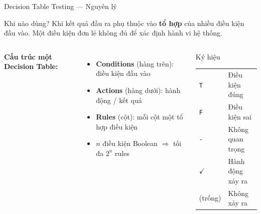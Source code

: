 \documentclass[aspectratio=169,12pt]{beamer}
\begin{document}
\begin{frame}{Decision Table Testing --- Nguyên lý}
  \begin{block}{Khi nào dùng?}
    Khi kết quả đầu ra phụ thuộc vào \textbf{tổ hợp} của nhiều điều kiện
    đầu vào. Một điều kiện đơn lẻ không đủ để xác định hành vi hệ thống.
  \end{block}

  \vspace{0.4em}
  \begin{columns}[T,onlytextwidth]
    \textbf{Cấu trúc một Decision Table:}
    \begin{itemize}
      \item \textbf{Conditions} (hàng trên): điều kiện đầu vào
      \item \textbf{Actions} (hàng dưới): hành động / kết quả
      \item \textbf{Rules} (cột): mỗi cột một tổ hợp điều kiện
      \item $n$ điều kiện Boolean $\Rightarrow$ tối đa $2^n$ rules
    \end{itemize}

    \begin{block}{Ký hiệu}
      {\small
      \begin{tabular}{ll}
        \texttt{T} & Điều kiện đúng \\
        \texttt{F} & Điều kiện sai \\
        \texttt{-} & Không quan trọng \\
        $\checkmark$ & Hành động xảy ra \\
        (trống) & Không xảy ra \\
      \end{tabular}
      }
    \end{block}
  \end{columns}
\end{frame}
\end{document}
